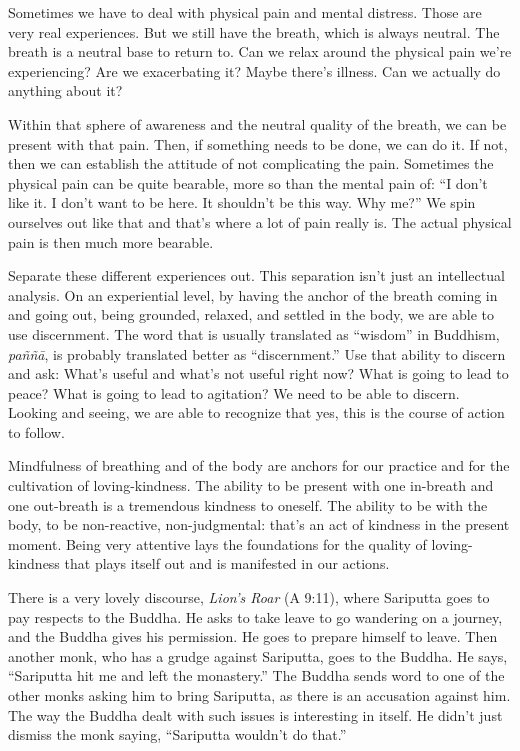 Sometimes we have to deal with physical pain and mental distress. Those
are very real experiences. But we still have the breath, which is always
neutral. The breath is a neutral base to return to. Can we relax around
the physical pain we’re experiencing? Are we exacerbating it? Maybe
there’s illness. Can we actually do anything about it?

Within that sphere of awareness and the neutral quality of the breath,
we can be present with that pain. Then, if something needs to be done,
we can do it. If not, then we can establish the attitude of not
complicating the pain. Sometimes the physical pain can be quite
bearable, more so than the mental pain of: “I don’t like it. I don’t
want to be here. It shouldn’t be this way. Why me?” We spin ourselves
out like that and that’s where a lot of pain really is. The actual
physical pain is then much more bearable.

Separate these different experiences out. This separation isn’t just an
intellectual analysis. On an experiential level, by having the anchor of
the breath coming in and going out, being grounded, relaxed, and settled
in the body, we are able to use discernment. The word that is usually
translated as “wisdom” in Buddhism, \emph{paññā}, is probably translated
better as “discernment.” Use that ability to discern and ask: What’s
useful and what’s not useful right now? What is going to lead to peace?
What is going to lead to agitation? We need to be able to discern.
Looking and seeing, we are able to recognize that yes, this is the
course of action to follow.

Mindfulness of breathing and of the body are anchors for our practice
and for the cultivation of loving-kindness. The ability to be present
with one in-breath and one out-breath is a tremendous kindness to
oneself. The ability to be with the body, to be non-reactive,
non-judgmental: that’s an act of kindness in the present moment. Being
very attentive lays the foundations for the quality of loving-kindness
that plays itself out and is manifested in our actions.

There is a very lovely discourse, \emph{Lion's Roar} (A 9:11), where
Sariputta goes to pay respects to the Buddha. He asks to take leave to
go wandering on a journey, and the Buddha gives his permission. He goes
to prepare himself to leave. Then another monk, who has a grudge against
Sariputta, goes to the Buddha. He says, “Sariputta hit me and left the
monastery.” The Buddha sends word to one of the other monks asking him
to bring Sariputta, as there is an accusation against him. The way the
Buddha dealt with such issues is interesting in itself. He didn’t just
dismiss the monk saying, “Sariputta wouldn’t do that.”


